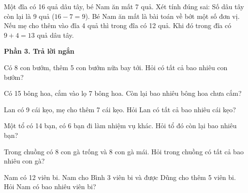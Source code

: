 \begin{ex} %
Một đĩa có 16 quả dâu tây, bé Nam ăn mất 7 quả. Xét tính đúng sai:
\choiceTF
{\True Số dâu tây còn lại là 9 quả ($16 - 7 = 9$).}
{\True Bé Nam ăn mất là bài toán về bớt một số đơn vị.}
{Nếu mẹ cho thêm vào đĩa 4 quả thì trong đĩa có 12 quả.}
{\True Khi đó trong đĩa có $9 + 4 = 13$ quả dâu tây.}
\end{ex}

\textbf{Phần 3. Trả lời ngắn}

\begin{ex} %
Có 8 con bướm, thêm 5 con bướm nữa bay tới. Hỏi có tất cả bao nhiêu con bướm?
\end{ex}

\begin{ex} %
Có 15 bông hoa, cắm vào lọ 7 bông hoa. Còn lại bao nhiêu bông hoa chưa cắm?
\end{ex}

\begin{ex} %
Lan có 9 cái kẹo, mẹ cho thêm 7 cái kẹo. Hỏi Lan có tất cả bao nhiêu cái kẹo?
\end{ex}

\begin{ex} %
Một tổ có 14 bạn, có 6 bạn đi làm nhiệm vụ khác. Hỏi tổ đó còn lại bao nhiêu bạn?
\end{ex}

\begin{ex} %
Trong chuồng có 8 con gà trống và 8 con gà mái. Hỏi trong chuồng có tất cả bao nhiêu con gà?
\end{ex}

\begin{ex} %
Nam có 12 viên bi. Nam cho Bình 3 viên bi và được Dũng cho thêm 5 viên bi. Hỏi Nam có bao nhiêu viên bi?
\end{ex}

